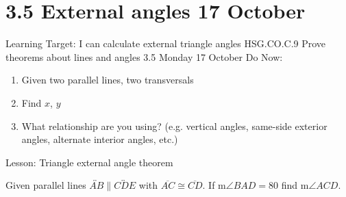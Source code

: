 \section{3.5 External angles \hfill 17 October}
\begin{frame}{Learning Target: I can calculate external triangle angles}
  {HSG.CO.C.9 Prove theorems about lines and angles  \hfill \alert{3.5 Monday 17 October}}
  Do Now: 
  \begin{multicols}{2}
    \begin{enumerate}
      \item Given two parallel lines, two transversals
      \item Find $x$, $y$
      \item What relationship are you using? (e.g. vertical angles, same-side exterior angles, alternate interior angles, etc.)
    \end{enumerate}
  \end{multicols}
  Lesson: Triangle external angle theorem
\end{frame}

\begin{frame}
  Given parallel lines $\overleftrightarrow{AB} \parallel \overleftrightarrow{CDE}$ with $\overline{AC} \cong \overline{CD}$. If m$\angle BAD=80$ find m$\angle ACD$.
  \begin{flushright}
  \end{flushright} \vspace{1cm}
  \end{frame}


